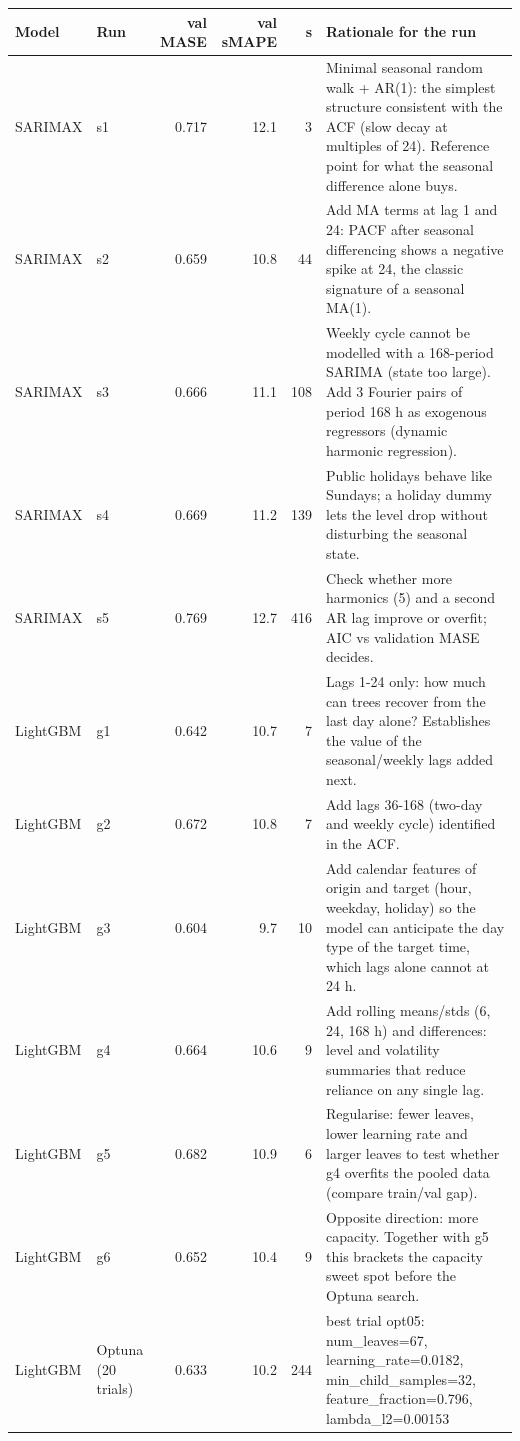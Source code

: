 \begin{tabular}{l l rr r p{10.4cm}}
\toprule
Model & Run & val MASE & val sMAPE & s & Rationale for the run \\
\midrule
SARIMAX & s1 & 0.717 & 12.1 & 3 & Minimal seasonal random walk + AR(1): the simplest structure consistent with the ACF (slow decay at multiples of 24). Reference point for what the seasonal difference alone buys. \\
SARIMAX & s2 & 0.659 & 10.8 & 44 & Add MA terms at lag 1 and 24: PACF after seasonal differencing shows a negative spike at 24, the classic signature of a seasonal MA(1). \\
SARIMAX & s3 & 0.666 & 11.1 & 108 & Weekly cycle cannot be modelled with a 168-period SARIMA (state too large). Add 3 Fourier pairs of period 168 h as exogenous regressors (dynamic harmonic regression). \\
SARIMAX & s4 & 0.669 & 11.2 & 139 & Public holidays behave like Sundays; a holiday dummy lets the level drop without disturbing the seasonal state. \\
SARIMAX & s5 & 0.769 & 12.7 & 416 & Check whether more harmonics (5) and a second AR lag improve or overfit; AIC vs validation MASE decides. \\
LightGBM & g1 & 0.642 & 10.7 & 7 & Lags 1-24 only: how much can trees recover from the last day alone? Establishes the value of the seasonal/weekly lags added next. \\
LightGBM & g2 & 0.672 & 10.8 & 7 & Add lags 36-168 (two-day and weekly cycle) identified in the ACF. \\
LightGBM & g3 & 0.604 & 9.7 & 10 & Add calendar features of origin and target (hour, weekday, holiday) so the model can anticipate the day type of the target time, which lags alone cannot at 24 h. \\
LightGBM & g4 & 0.664 & 10.6 & 9 & Add rolling means/stds (6, 24, 168 h) and differences: level and volatility summaries that reduce reliance on any single lag. \\
LightGBM & g5 & 0.682 & 10.9 & 6 & Regularise: fewer leaves, lower learning rate and larger leaves to test whether g4 overfits the pooled data (compare train/val gap). \\
LightGBM & g6 & 0.652 & 10.4 & 9 & Opposite direction: more capacity. Together with g5 this brackets the capacity sweet spot before the Optuna search. \\
LightGBM & Optuna (20 trials) & 0.633 & 10.2 & 244 & best trial opt05: num\_leaves=67, learning\_rate=0.0182, min\_child\_samples=32, feature\_fraction=0.796, lambda\_l2=0.00153 \\

\end{tabular}
